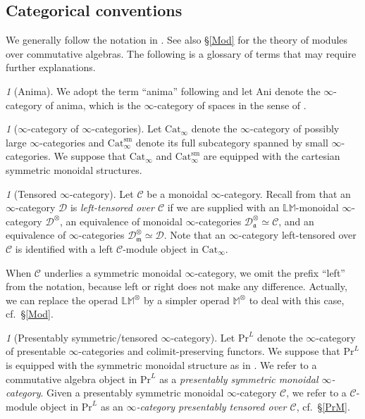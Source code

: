 \documentclass{amsart}
\theoremstyle{plain}
\theoremstyle{definition}
\theoremstyle{remark}
\newtheorem{p}[theorem]{}
\numberwithin{equation}{theorem}
\newcommand{\mcal}[1]{\mathcal{#1}}
\newcommand{\mbb}[1]{\mathbb{#1}}
\newcommand{\mfk}[1]{\mathfrak{#1}}
\newcommand{\Ani}{\mathrm{Ani}}
\newcommand{\Cat}{\mathrm{Cat}}
\renewcommand{\Pr}{\mathrm{Pr}}
\newcommand{\sm}{\mathrm{sm}}
\begin{document}
\subsection{Categorical conventions}\label{CCo}

We generally follow the notation in \cite{HTT,HA}.
See also \S\ref{Mod} for the theory of modules over commutative algebras.
The following is a glossary of terms that may require further explanations.

\begin{p}[Anima]
We adopt the term ``anima'' following \cite{CS} and let $\Ani$ denote the $\infty$-category of anima, which is the $\infty$-category of spaces in the sense of \cite{HTT}.
\end{p}

\begin{p}[$\infty$-category of $\infty$-categories]
Let $\Cat_\infty$ denote the $\infty$-category of possibly large $\infty$-categories and $\Cat_\infty^\sm$ denote its full subcategory spanned by small $\infty$-categories.
We suppose that $\Cat_\infty$ and $\Cat_\infty^\sm$ are equipped with the cartesian symmetric monoidal structures.
\end{p}

\begin{p}[Tensored $\infty$-category]
Let $\mcal{C}$ be a monoidal $\infty$-category.
Recall from \cite[4.2.1.19]{HA} that an $\infty$-category $\mcal{D}$ is \textit{left-tensored over $\mcal{C}$} if we are supplied with an $\mbb{LM}$-monoidal $\infty$-category $\mcal{D}^\otimes$, an equivalence of monoidal $\infty$-categories $\mcal{D}^\otimes_\mfk{a}\simeq\mcal{C}$, and an equivalence of $\infty$-categories $\mcal{D}^\otimes_\mfk{m}\simeq\mcal{D}$.
Note that an $\infty$-category left-tensored over $\mcal{C}$ is identified with a left $\mcal{C}$-module object in $\Cat_\infty$.

When $\mcal{C}$ underlies a symmetric monoidal $\infty$-category, we omit the prefix ``left'' from the notation, because left or right does not make any difference.
Actually, we can replace the operad $\mbb{LM}^\otimes$ by a simpler operad $\mbb{M}^\otimes$ to deal with this case, cf.\ \S\ref{Mod}.
\end{p}

\begin{p}[Presentably symmetric/tensored $\infty$-category]
Let $\Pr^L$ denote the $\infty$-category of presentable $\infty$-categories and colimit-preserving functors.
We suppose that $\Pr^L$ is equipped with the symmetric monoidal structure as in \cite[4.8.1.15]{HA}.
We refer to a commutative algebra object in $\Pr^L$ as a \textit{presentably symmetric monoidal $\infty$-category}.
Given a presentably symmetric monoidal $\infty$-category $\mcal{C}$, we refer to a $\mcal{C}$-module object in $\Pr^L$ as an \textit{$\infty$-category presentably tensored over $\mcal{C}$}, cf.\ \S\ref{PrM}.
\end{p}
\end{document}
